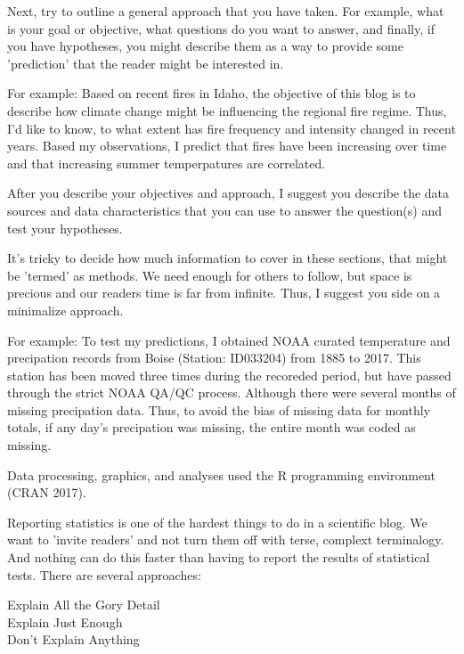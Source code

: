 \documentclass{tufte-handout}\usepackage[]{graphicx}\usepackage[]{color}
\begin{document}
Next, try to outline a general approach that you have taken. For example, what is your goal or objective, what questions do you want to answer, and finally, if you have hypotheses, you might describe them as a way to provide some 'prediction' that the reader might be interested in. 

For example: Based on recent fires in Idaho, the objective of this blog is to describe how climate change might be influencing the regional fire regime. Thus, I'd like to know, to what extent has fire frequency and intensity changed in recent years. Based my observations, I predict that fires have been increasing over time and that increasing summer temperpatures are correlated. 

After you describe your objectives and approach, I suggest you describe the data sources and data characteristics that you can use to answer the question(s) and test your hypotheses.

It's tricky to decide how much information to cover in these sections, that might be 'termed' as methods. We need enough for others to follow, but space is precious and our readers time is far from infinite. Thus, I suggest you side on a minimalize approach. 

For example: To test my predictions, I obtained NOAA curated temperature and precipation records from Boise (Station: ID033204) from 1885 to 2017. This station has been moved three times during the recoreded period, but have passed through the strict NOAA QA/QC process. Although there were several months of missing precipation data. Thus, to avoid the bias of missing data for monthly totals, if any day's precipation was missing, the entire month was coded as missing. 

Data processing, graphics, and analyses used the R programming environment (CRAN 2017). 

Reporting statistics is one of the hardest things to do in a scientific blog. We want to 'invite readers' and not turn them off with terse, complext terminalogy. And nothing can do this faster than having to report the results of statistical tests. There are several approaches:

\begin{description}
\item[Explain All the Gory Detail]
\item[Explain Just Enough]
\item[Don't Explain Anything]

\end{description}
\end{document}
